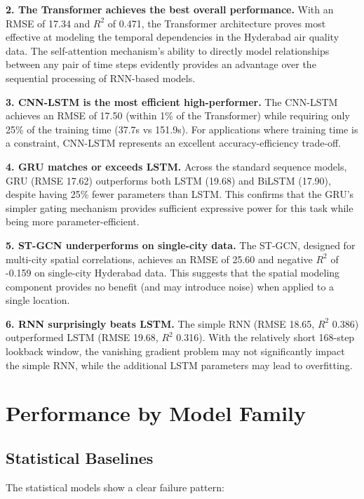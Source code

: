 \textbf{2. The Transformer achieves the best overall performance.} With an RMSE of 17.34 and $R^2$ of 0.471, the Transformer architecture proves most effective at modeling the temporal dependencies in the Hyderabad air quality data. The self-attention mechanism's ability to directly model relationships between any pair of time steps evidently provides an advantage over the sequential processing of RNN-based models.

\textbf{3. CNN-LSTM is the most efficient high-performer.} The CNN-LSTM achieves an RMSE of 17.50 (within 1\% of the Transformer) while requiring only 25\% of the training time (37.7s vs 151.9s). For applications where training time is a constraint, CNN-LSTM represents an excellent accuracy-efficiency trade-off.

\textbf{4. GRU matches or exceeds LSTM.} Across the standard sequence models, GRU (RMSE 17.62) outperforms both LSTM (19.68) and BiLSTM (17.90), despite having 25\% fewer parameters than LSTM. This confirms that the GRU's simpler gating mechanism provides sufficient expressive power for this task while being more parameter-efficient.

\textbf{5. ST-GCN underperforms on single-city data.} The ST-GCN, designed for multi-city spatial correlations, achieves an RMSE of 25.60 and negative $R^2$ of -0.159 on single-city Hyderabad data. This suggests that the spatial modeling component provides no benefit (and may introduce noise) when applied to a single location.

\textbf{6. RNN surprisingly beats LSTM.} The simple RNN (RMSE 18.65, $R^2$ 0.386) outperformed LSTM (RMSE 19.68, $R^2$ 0.316). With the relatively short 168-step lookback window, the vanishing gradient problem may not significantly impact the simple RNN, while the additional LSTM parameters may lead to overfitting.

\section{Performance by Model Family}

\subsection{Statistical Baselines}

The statistical models show a clear failure pattern:

